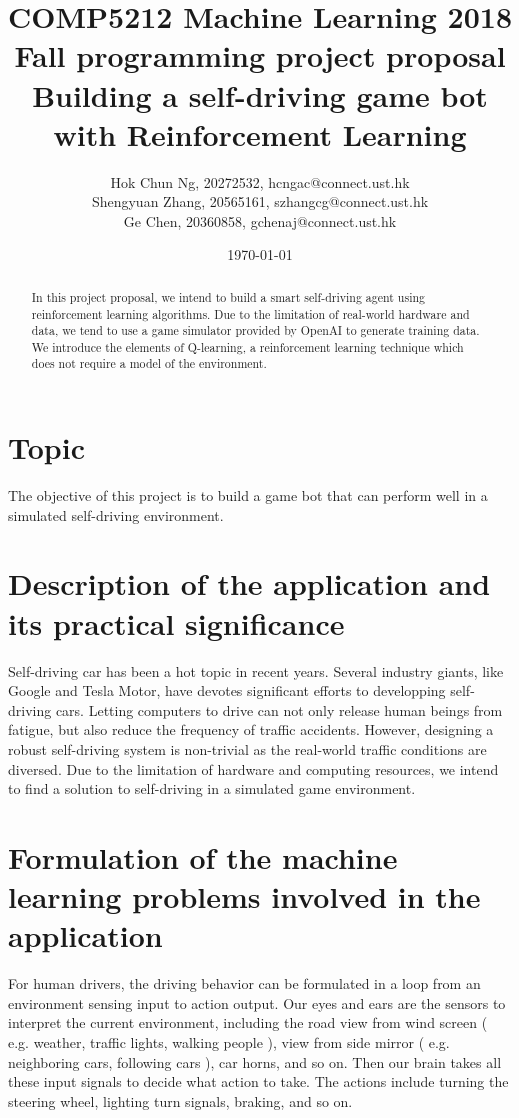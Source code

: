 \documentclass[a4paper]{article}
\title{COMP5212 Machine Learning 2018 Fall programming project proposal \\ 
       Building a self-driving game bot with Reinforcement Learning}
\author{Hok Chun Ng, 20272532, hcngac@connect.ust.hk \\
        Shengyuan Zhang, 20565161, szhangcg@connect.ust.hk \\
        Ge Chen, 20360858, gchenaj@connect.ust.hk}
\date{\today}
\begin{document}
\maketitle

\begin{abstract}
In this project proposal, we intend to build a smart self-driving agent using
reinforcement learning algorithms. Due to the limitation of real-world hardware
and data, we tend to use a game simulator provided by OpenAI to generate training
data. We introduce the elements of Q-learning, a reinforcement learning technique
which does not require a model of the environment.
\end{abstract}

\section{Topic}

The objective of this project is to build a game bot that can perform well in a
simulated self-driving environment. 

\section{Description of the application and its practical significance}

Self-driving car has been a hot topic in recent years. Several industry giants,
like Google and Tesla Motor, have devotes significant efforts to developping
self-driving cars. Letting computers to drive
can not only release human beings from fatigue, but also reduce the frequency of
traffic accidents. However, designing a robust self-driving system is non-trivial
as the real-world traffic conditions are diversed. Due to the limitation of
hardware and computing resources, we intend to find a solution to self-driving in
a simulated game environment.


\section{Formulation of the machine learning problems involved in the application}

For human drivers, the driving behavior can be formulated in a loop from an environment
sensing input to action output. Our eyes and ears are the sensors to interpret the
current environment, including the road view from wind screen ( e.g. weather, traffic lights,
walking people ), view from side mirror ( e.g. neighboring cars, following cars ),
car horns, and so on. Then our brain takes all these input signals to decide what action
to take. The actions include turning the steering wheel, lighting turn signals, braking,
and so on.
\end{document}
